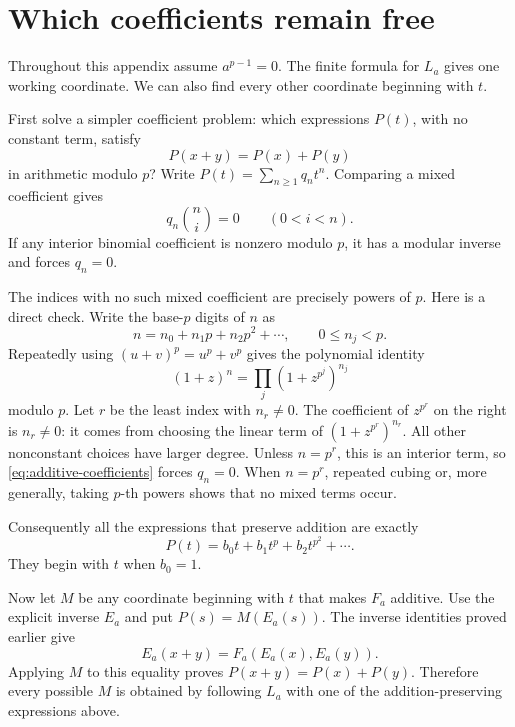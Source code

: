 \documentclass[11pt,letterpaper]{article}
\numberwithin{equation}{section}
\theoremstyle{definition}\newtheorem{example}[theorem]{Example}
\begin{document}
\section{Which coefficients remain free}\label{app:freedom}

Throughout this appendix assume \(a^{p-1}=0\). The finite formula for \(L_a\) gives one working coordinate. We can also find every other coordinate beginning with \(t\).

First solve a simpler coefficient problem: which expressions \(P(t)\), with no constant term, satisfy
\[
 P(x+y)=P(x)+P(y)
\]
in arithmetic modulo \(p\)? Write \(P(t)=\sum_{n\ge1}q_nt^n\). Comparing a mixed coefficient gives
\begin{equation}\label{eq:additive-coefficients}
 q_n\binom ni=0\qquad(0<i<n).
\end{equation}
If any interior binomial coefficient is nonzero modulo \(p\), it has a modular inverse and forces \(q_n=0\).

The indices with no such mixed coefficient are precisely powers of \(p\). Here is a direct check. Write the base-\(p\) digits of \(n\) as
\[
 n=n_0+n_1p+n_2p^2+\cdots,\qquad0\le n_j<p.
\]
Repeatedly using \((u+v)^p=u^p+v^p\) gives the polynomial identity
\[
 (1+z)^n=\prod_j(1+z^{p^j})^{n_j}
\]
modulo \(p\). Let \(r\) be the least index with \(n_r\ne0\). The coefficient of \(z^{p^r}\) on the right is \(n_r\ne0\): it comes from choosing the linear term of \((1+z^{p^r})^{n_r}\). All other nonconstant choices have larger degree. Unless \(n=p^r\), this is an interior term, so \eqref{eq:additive-coefficients} forces \(q_n=0\). When \(n=p^r\), repeated cubing or, more generally, taking \(p\)-th powers shows that no mixed terms occur.

Consequently all the expressions that preserve addition are exactly
\[
 P(t)=b_0t+b_1t^p+b_2t^{p^2}+\cdots.
\]
They begin with \(t\) when \(b_0=1\).

Now let \(M\) be any coordinate beginning with \(t\) that makes \(F_a\) additive. Use the explicit inverse \(E_a\) and put \(P(s)=M(E_a(s))\). The inverse identities proved earlier give
\[
 E_a(x+y)=F_a(E_a(x),E_a(y)).
\]
Applying \(M\) to this equality proves \(P(x+y)=P(x)+P(y)\). Therefore every possible \(M\) is obtained by following \(L_a\) with one of the addition-preserving expressions above.
\end{document}
